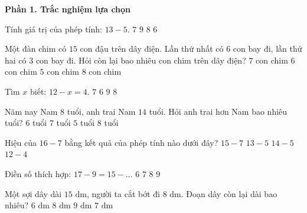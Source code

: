 \textbf{Phần 1. Trắc nghiệm lựa chọn}

\begin{ex} %
Tính giá trị của phép tính: $13 - 5$.
\choice
{$7$}
{$9$}
{\True $8$}
{$6$}
\end{ex}

\begin{ex} %
Một đàn chim có $15$ con đậu trên dây điện. Lần thứ nhất có $6$ con bay đi, lần thứ hai có $3$ con bay đi. Hỏi còn lại bao nhiêu con chim trên dây điện?
\choice
{$7$ con chim}
{\True $6$ con chim}
{$5$ con chim}
{$8$ con chim}
\end{ex}

\begin{ex} %
Tìm $x$ biết: $12 - x = 4$.
\choice
{$7$}
{$6$}
{$9$}
{\True $8$}
\end{ex}

\begin{ex} %
Năm nay Nam $8$ tuổi, anh trai Nam $14$ tuổi. Hỏi anh trai hơn Nam bao nhiêu tuổi?
\choice
{\True $6$ tuổi}
{$7$ tuổi}
{$5$ tuổi}
{$8$ tuổi}
\end{ex}

\begin{ex} %
Hiệu của $16 - 7$ bằng kết quả của phép tính nào dưới đây?
\choice
{$15 - 7$}
{$13 - 5$}
{\True $14 - 5$}
{$12 - 4$}
\end{ex}

\begin{ex} %
Điền số thích hợp: $17 - 9 = 15 - \dots$
\choice
{$6$}
{\True $7$}
{$8$}
{$9$}
\end{ex}

\begin{ex} %
Một sợi dây dài $15\text{ dm}$, người ta cắt bớt đi $8\text{ dm}$. Đoạn dây còn lại dài bao nhiêu?
\choice
{$6\text{ dm}$}
{$8\text{ dm}$}
{$9\text{ dm}$}
{\True $7\text{ dm}$}
\end{ex}

